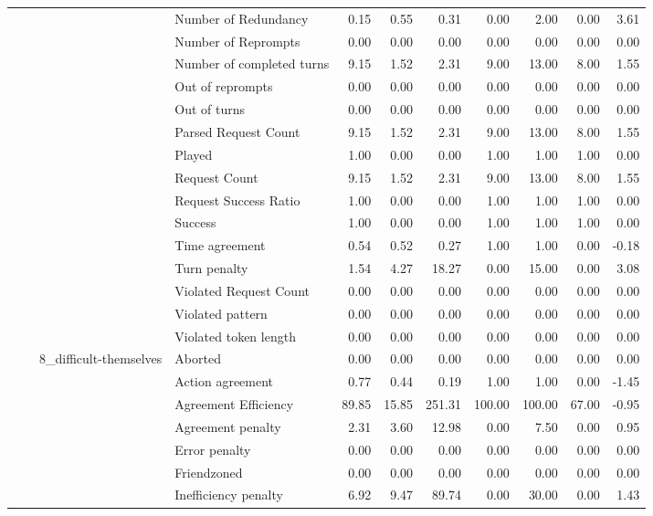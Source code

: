 \begin{tabular}{llllrrrrrrr}
 &  &  & Number of Redundancy & 0.15 & 0.55 & 0.31 & 0.00 & 2.00 & 0.00 & 3.61 \\
 &  &  & Number of Reprompts & 0.00 & 0.00 & 0.00 & 0.00 & 0.00 & 0.00 & 0.00 \\
 &  &  & Number of completed turns & 9.15 & 1.52 & 2.31 & 9.00 & 13.00 & 8.00 & 1.55 \\
 &  &  & Out of reprompts & 0.00 & 0.00 & 0.00 & 0.00 & 0.00 & 0.00 & 0.00 \\
 &  &  & Out of turns & 0.00 & 0.00 & 0.00 & 0.00 & 0.00 & 0.00 & 0.00 \\
 &  &  & Parsed Request Count & 9.15 & 1.52 & 2.31 & 9.00 & 13.00 & 8.00 & 1.55 \\
 &  &  & Played & 1.00 & 0.00 & 0.00 & 1.00 & 1.00 & 1.00 & 0.00 \\
 &  &  & Request Count & 9.15 & 1.52 & 2.31 & 9.00 & 13.00 & 8.00 & 1.55 \\
 &  &  & Request Success Ratio & 1.00 & 0.00 & 0.00 & 1.00 & 1.00 & 1.00 & 0.00 \\
 &  &  & Success & 1.00 & 0.00 & 0.00 & 1.00 & 1.00 & 1.00 & 0.00 \\
 &  &  & Time agreement & 0.54 & 0.52 & 0.27 & 1.00 & 1.00 & 0.00 & -0.18 \\
 &  &  & Turn penalty & 1.54 & 4.27 & 18.27 & 0.00 & 15.00 & 0.00 & 3.08 \\
 &  &  & Violated Request Count & 0.00 & 0.00 & 0.00 & 0.00 & 0.00 & 0.00 & 0.00 \\
 &  &  & Violated pattern & 0.00 & 0.00 & 0.00 & 0.00 & 0.00 & 0.00 & 0.00 \\
 &  &  & Violated token length & 0.00 & 0.00 & 0.00 & 0.00 & 0.00 & 0.00 & 0.00 \\
\cline{3-11}
 &  & \multirow[t]{27}{*}{8_difficult-themselves} & Aborted & 0.00 & 0.00 & 0.00 & 0.00 & 0.00 & 0.00 & 0.00 \\
 &  &  & Action agreement & 0.77 & 0.44 & 0.19 & 1.00 & 1.00 & 0.00 & -1.45 \\
 &  &  & Agreement Efficiency & 89.85 & 15.85 & 251.31 & 100.00 & 100.00 & 67.00 & -0.95 \\
 &  &  & Agreement penalty & 2.31 & 3.60 & 12.98 & 0.00 & 7.50 & 0.00 & 0.95 \\
 &  &  & Error penalty & 0.00 & 0.00 & 0.00 & 0.00 & 0.00 & 0.00 & 0.00 \\
 &  &  & Friendzoned & 0.00 & 0.00 & 0.00 & 0.00 & 0.00 & 0.00 & 0.00 \\
 &  &  & Inefficiency penalty & 6.92 & 9.47 & 89.74 & 0.00 & 30.00 & 0.00 & 1.43 \\

\end{tabular}
